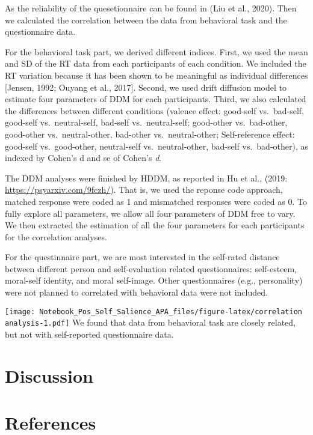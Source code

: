 \documentclass[man]{apa6}
\begin{document}
As the reliability of the quesetionnaire can be found in (Liu et al., 2020). Then we calculated the correlation between the data from behavioral task and the questionnaire data.

For the behavioral task part, we derived different indices. First, we used the mean and SD of the RT data from each participants of each condition. We included the RT variation because it has been shown to be meaningful as individual differences {[}Jensen, 1992; Ouyang et al., 2017{]}. Second, we used drift diffusion model to estimate four parameters of DDM for each participants. Third, we also calculated the differences between different conditions (valence effect: good-self vs.~bad-self, good-self vs.~neutral-self, bad-self vs.~neutral-self; good-other vs.~bad-other, good-other vs.~neutral-other, bad-other vs.~neutral-other; Self-reference effect: good-self vs.~good-other, neutral-self vs.~neutral-other, bad-self vs.~bad-other), as indexed by Cohen's d and se of Cohen's \emph{d}.

The DDM analyses were finished by HDDM, as reported in Hu et al., (2019: \url{https://psyarxiv.com/9fczh/}). That is, we used the reponse code approach, matched response were coded as 1 and mismatched responses were coded as 0. To fully explore all parameters, we allow all four parameters of DDM free to vary. We then extracted the estimation of all the four parameters for each participants for the correlation analyses.

For the questinnaire part, we are most interested in the self-rated distance between different person and self-evaluation related questionnaires: self-esteem, moral-self identity, and moral self-image. Other questionnaires (e.g., personality) were not planned to correlated with behavioral data were not included.

\texttt{[image: Notebook\_Pos\_Self\_Salience\_APA\_files/figure-latex/correlation analysis-1.pdf]}
We found that data from behavioral task are closely related, but not with self-reported questionnaire data.

\hypertarget{discussion}{%
\section{Discussion}\label{discussion}}

\hypertarget{references}{%
\section{References}\label{references}}
\end{document}
